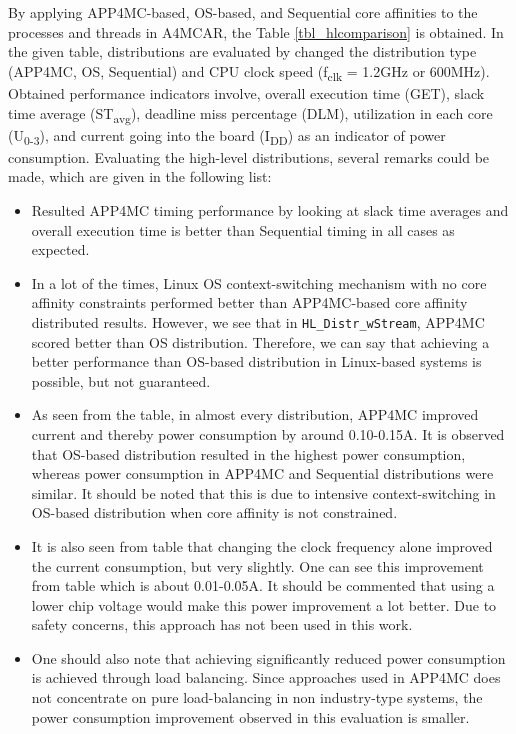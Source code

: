 By applying APP4MC-based, OS-based, and Sequential core affinities to the processes and threads in A4MCAR, the Table \ref{tbl_hlcomparison} is obtained. In the given table, distributions are evaluated by changed the distribution type (APP4MC, OS, Sequential) and CPU clock speed (f\textsubscript{clk} = 1.2GHz or 600MHz). Obtained performance indicators involve, overall execution time (GET), slack time average (ST\textsubscript{avg}), deadline miss percentage (DLM), utilization in each core (U\textsubscript{0-3}), and current going into the board (I\textsubscript{DD}) as an indicator of power consumption. Evaluating the high-level distributions, several remarks could be made, which are given in the following list:

\hlcomparison

\begin{itemize}
	\item Resulted APP4MC timing performance by looking at slack time averages and overall execution time is better than Sequential timing in all cases as expected.
	\item In a lot of the times, Linux OS context-switching mechanism with no core affinity constraints performed better than APP4MC-based core affinity distributed results. However, we see that in \texttt{HL{\_}Distr{\_}wStream}, APP4MC scored better than OS distribution. Therefore, we can say that achieving a better performance than OS-based distribution in Linux-based systems is possible, but not guaranteed.
	\item As seen from the table, in almost every distribution, APP4MC improved current and thereby power consumption by around 0.10-0.15A. It is observed that OS-based distribution resulted in the highest power consumption, whereas power consumption in APP4MC and Sequential distributions were similar. It should be noted that this is due to intensive context-switching in OS-based distribution when core affinity is not constrained.
	\item It is also seen from table that changing the clock frequency alone improved the current consumption, but very slightly. One can see this improvement from table which is about 0.01-0.05A. It should be commented that using a lower chip voltage would make this power improvement a lot better. Due to safety concerns, this approach has not been used in this work. 
	\item One should also note that achieving significantly reduced power consumption is achieved through load balancing. Since approaches used in APP4MC does not concentrate on pure load-balancing in non industry-type systems, the power consumption improvement observed in this evaluation is smaller.

\end{itemize}
